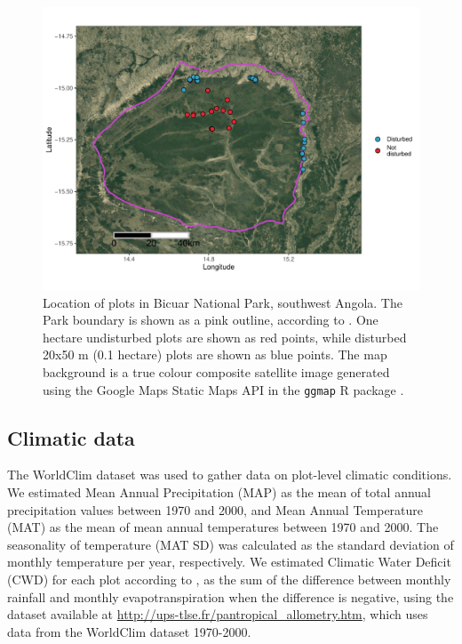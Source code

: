 \begin{refsection}
\begin{figure}[!h]
\centering
	\includegraphics[width=\textwidth]{img/bicuar_map}
	\caption[Location of plots within Bicuar National Park]{Location of plots in Bicuar National Park, southwest Angola. The Park boundary is shown as a pink outline, according to \citet{WDPA2019}. One hectare undisturbed plots are shown as red points, while disturbed 20x50 m (0.1 hectare) plots are shown as blue points. The map background is a true colour composite satellite image generated using the Google Maps Static Maps API in the \texttt{ggmap} R package \citep{ggmap}.}
	\label{bicuar:bicuar_map}
\end{figure}

\subsection{Climatic data}
\label{bicuar:ssec:climate}

The WorldClim dataset \citep{Fick2017} was used to gather data on plot-level climatic conditions. We estimated Mean Annual Precipitation (MAP) as the mean of total annual precipitation values between 1970 and 2000, and Mean Annual Temperature (MAT) as the mean of mean annual temperatures between 1970 and 2000. The seasonality of temperature (MAT SD) was calculated as the standard deviation of monthly temperature per year, respectively. We estimated Climatic Water Deficit (CWD) for each plot according to \citep{Chave2014}, as the sum of the difference between monthly rainfall and monthly evapotranspiration when the difference is negative, using the dataset available at \url{http://ups-tlse.fr/pantropical_allometry.htm}, which uses data from the WorldClim dataset 1970-2000.


\end{refsection}
